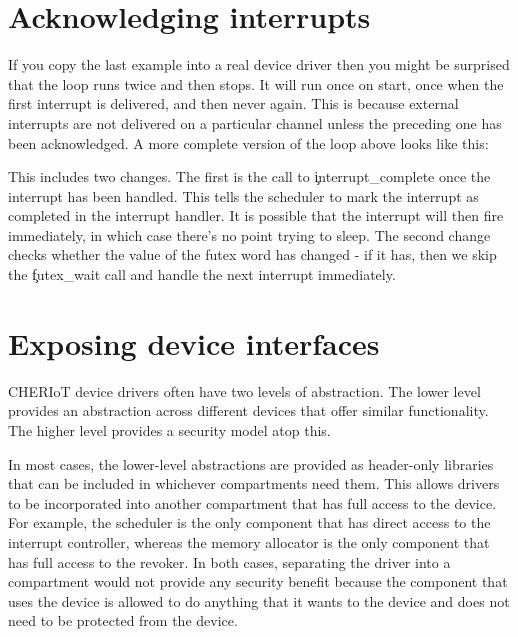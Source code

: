 \section{Acknowledging interrupts}

If you copy the last example into a real device driver then you might be surprised that the loop runs twice and then stops.
It will run once on start, once when the first interrupt is delivered, and then never again.
This is because external interrupts are not delivered on a particular channel unless the preceding one has been acknowledged.
A more complete version of the loop above looks like this:

\begin{cxxsnippet}
do
{
    uint32_t last = *ethernetFutex;
    // Handle interrupt here
    interrupt_complete(
      STATIC_SEALED_VALUE(ethernetInterruptCapability));
\} while ((last != *ethernetFutex) ||
         (futex_wait(ethernetFutex, last) == 0));
\end{cxxsnippet}

This includes two changes.
The first is the call to \c{interrupt_complete} once the interrupt has been handled.
This tells the scheduler to mark the interrupt as completed in the interrupt handler.
It is possible that the interrupt will then fire immediately, in which case there's no point trying to sleep.
The second change checks whether the value of the futex word has changed - if it has, then we skip the \c{futex_wait} call and handle the next interrupt immediately.

\section{Exposing device interfaces}

CHERIoT device drivers often have two levels of abstraction.
The lower level provides an abstraction across different devices that offer similar functionality.
The higher level provides a security model atop this.

In most cases, the lower-level abstractions are provided as header-only libraries that can be included in whichever compartments need them.
This allows drivers to be incorporated into another compartment that has full access to the device.
For example, the scheduler is the only component that has direct access to the interrupt controller, whereas the memory allocator is the only component that has full access to the revoker.
In both cases, separating the driver into a compartment would not provide any security benefit because the component that uses the device is allowed to do anything that it wants to the device and does not need to be protected from the device.

